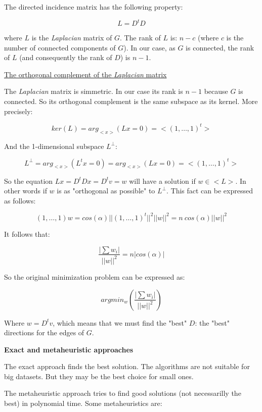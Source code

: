 \documentclass[a4paper,11pt]{article}
\begin{document}
\bigskip

The directed incidence matrix has the following property:

$$L = D^t D$$

where $L$ is the \textit{Laplacian} matrix of $G$. The rank of 
$L$ is: $n-c$ (where $c$ is the number of connected components of $G$). 
In our case, as $G$ is connected, the rank of $L$ (and consequently the 
rank of $D$) is $n-1$.

\bigskip

\underline{The orthogonal complement of the \textit{Laplacian} matrix}

\bigskip

The \textit{Laplacian} matrix is simmetric. In our case its rank is $n-1$ 
because $G$ is connected. So its orthogonal complement is the same 
subspace as its kernel. More precisely:

$$ker(L) = arg_{<x>} (L x = 0) = <(1,\dots,1)^t>$$

And the 1-dimensional subspace $L^{\bot}$:

$$L^{\bot} = arg_{<x>} (L^t x = 0) = arg_{<x>} (L x = 0) = <(1,\dots,1)^t>$$

So the equation $L x = D^t D x = D^t v = w$ will have a solution if $w 
\in <L>$. In other words if $w$ is as "orthogonal as possible" to 
$L^{\bot}$. This fact can be expressed as follows:

$$(1,\dots,1) w = cos(\alpha) ||(1,\dots,1)^t||^2 ||w||^2 = n \ cos(\alpha) 
||w||^2$$

It follows that:

$$\frac{|\sum w_i|}{||w||^2} = n |cos(\alpha)|$$

So the original minimization problem can be expressed as:

$$argmin_w(\frac{|\sum w_i|}{||w||^2})$$

Where $w = D^t v$, which means that we must find the "best" $D$: the 
"best" directions for the edges of $G$.

\bigskip


\textbf{Exact and metaheuristic approaches}

\bigskip

The exact approach finds the best solution. The algorithms are not 
suitable for big datasets. But they may be the best choice for small 
ones.

\bigskip

The metaheuristic approach tries to find good solutions (not 
necessarilly the best) in polynomial time. Some metaheuristics are:
\end{document}
